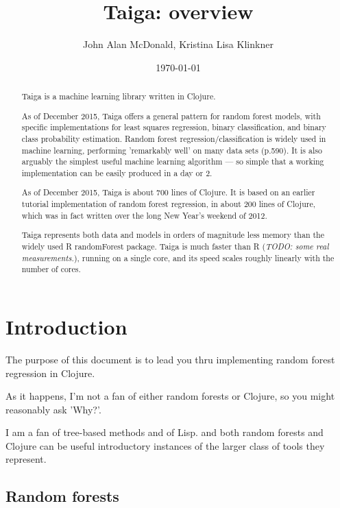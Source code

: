 \documentclass[10pt,openany]{article}
\title{Taiga: overview}
\author{John Alan McDonald, Kristina Lisa Klinkner}
\date{\today}
\numberwithin{definition}{section}
\numberwithin{example}{section}
\numberwithin{equation}{section}
\numberwithin{figure}{section}
\begin{document}
\maketitle

\begin{abstract}
Taiga is a machine learning library written in
Clojure. 

As of December 2015, Taiga offers a general
pattern for random forest models, with specific implementations for least 
squares regression, binary classification, and binary class probability 
estimation. 
Random forest regression/classification is widely used in machine learning, 
performing 'remarkably well' on many data sets 
(p.590\cite{hastie-tibshirani-friedman-2009}).
It is also arguably the simplest useful machine learning algorithm
--- so simple that a working implementation can be easily produced
in a day or 2. 

As of December 2015, Taiga is about 700 lines of Clojure.
It is based on an earlier tutorial implementation of random forest
regression, in about 200 lines of Clojure, which was in fact written
over the long New Year's weekend of 2012.

Taiga represents both data and models in orders of
magnitude less memory than the widely used R
randomForest\cite{r-randomForest} package.
Taiga is much faster than R (\textit{TODO: some real measurements.}), 
running on a single core, and its speed scales roughly linearly with the
number of cores.
\end{abstract}
\newpage{}

\tableofcontents{}
\newpage{}


\section{Introduction}

The purpose of this document is to lead you thru implementing random
forest regression in Clojure. 

As it happens, I'm not a fan of either random forests or Clojure,
so you might reasonably ask 'Why?'. 

I am a fan of tree-based methods and of Lisp. and both random forests
and Clojure can be useful introductory instances of the larger class
of tools they represent. 


\subsection{Random forests}
\end{document}
